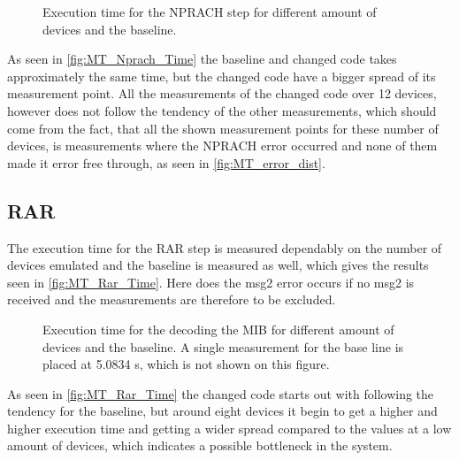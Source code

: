 \begin{figure}[H]
\centering
\resizebox{0.5\textwidth}{!}{
}
\caption{Execution time for the NPRACH step for different amount of devices and the baseline.}
\label{fig:MT_Nprach_Time}
\end{figure}

As seen in \autoref{fig:MT_Nprach_Time} the baseline and changed code takes approximately the same time, but the changed code have a bigger spread of its measurement point. All the measurements of the changed code over 12 devices, however does not follow the tendency of the other measurements, which should come from the fact, that all the shown measurement points for these number of devices, is measurements where the NPRACH error occurred and none of them made it error free through, as seen in \autoref{fig:MT_error_dist}.

\subsection{RAR}
The execution time for the RAR step is measured dependably on the number of devices emulated and the baseline is measured as well, which gives the results seen in \autoref{fig:MT_Rar_Time}. Here does the msg2 error occurs if no msg2 is received and the measurements are therefore to be excluded.

\begin{figure}[H]
\centering
\resizebox{0.5\textwidth}{!}{
}
\caption{Execution time for the decoding the MIB for different amount of devices and the baseline. A single measurement for the base line is placed at 5.0834 s, which is not shown on this figure.}
\label{fig:MT_Rar_Time}
\end{figure}

As seen in \autoref{fig:MT_Rar_Time} the changed code starts out with following the tendency for the baseline, but around eight devices it begin to get a higher and higher execution time and getting a wider spread compared to the values at a low amount of devices, which indicates a possible bottleneck in the system.

